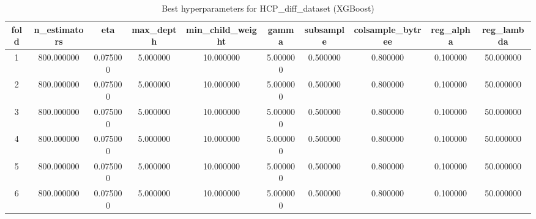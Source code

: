 \begin{table}[htbp]
\caption{Best hyperparameters for HCP_diff_dataset (XGBoost)}
\label{tab:best_hyperparams_HCP_diff_dataset}
\begin{tabular}{cccccccccc}
\toprule
fold & n_estimators & eta & max_depth & min_child_weight & gamma & subsample & colsample_bytree & reg_alpha & reg_lambda \\
\midrule
1 & 800.000000 & 0.075000 & 5.000000 & 10.000000 & 5.000000 & 0.500000 & 0.800000 & 0.100000 & 50.000000 \\
2 & 800.000000 & 0.075000 & 5.000000 & 10.000000 & 5.000000 & 0.500000 & 0.800000 & 0.100000 & 50.000000 \\
3 & 800.000000 & 0.075000 & 5.000000 & 10.000000 & 5.000000 & 0.500000 & 0.800000 & 0.100000 & 50.000000 \\
4 & 800.000000 & 0.075000 & 5.000000 & 10.000000 & 5.000000 & 0.500000 & 0.800000 & 0.100000 & 50.000000 \\
5 & 800.000000 & 0.075000 & 5.000000 & 10.000000 & 5.000000 & 0.500000 & 0.800000 & 0.100000 & 50.000000 \\
6 & 800.000000 & 0.075000 & 5.000000 & 10.000000 & 5.000000 & 0.500000 & 0.800000 & 0.100000 & 50.000000 \\
\bottomrule
\end{tabular}
\end{table}
